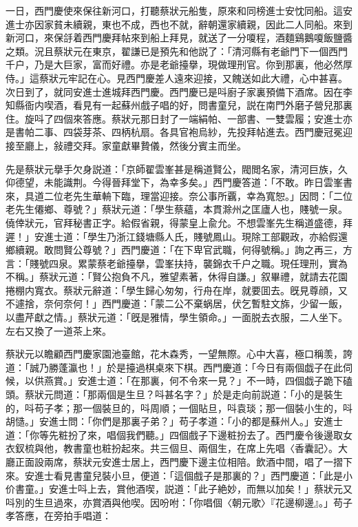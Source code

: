 一日，西門慶使來保往新河口，打聽蔡狀元船隻，原來和同榜進士安忱同船。這安進士亦因家貧未續親，東也不成，西也不就，辭朝還家續親，因此二人同船。來到新河口，來保㧱着西門慶拜帖來到船上拜見，就送了一分嗄程，酒麵鷄鵝嗄飯鹽醬之類。況且蔡狀元在東京，翟謙已是預先和他説了：「清河縣有老爺門下一個西門千户，乃是大巨家，富而好禮。亦是老爺擡擧，現做理刑官。你到那裏，他必然厚侍。」這蔡狀元牢記在心。見西門慶差人遠來迎接，又餽送如此大禮，心中甚喜。次日到了，就同安進士進城拜西門慶。西門慶已是呌廚子家裏預備下酒席。因在李知縣衙内喫酒，看見有一起蘇州戲子唱的好，問書童兒，説在南門外磨子營兒那裏住。旋呌了四個來答應。蔡狀元那日封了一端絹帕、一部書、一雙雲履；安進士亦是書帕二事、四袋芽茶、四柄杭扇。各具官袍烏紗，先投拜帖進去。西門慶冠冕迎接至廳上，敍禮交拜。家童獻畢贄儀，然後分賓主而坐。

先是蔡狀元擧手欠身説道：「京師翟雲峯甚是稱道賢公，閥閲名家，清河巨族，久仰德望，未能識荆。今得晉拜堂下，為幸多矣。」西門慶答道：「不敢。昨日雲峯書來，具道二位老先生華輈下臨，理當迎接。奈公事所覊，幸為寬恕。」因問：「二位老先生僊鄉、尊號？」蔡狀元道：「學生蔡蘊，本貫滁州之匡廬人也，賤號一泉。僥倖狀元，官拜秘書正字。給假省親，得蒙皇上兪允。不想雲峯先生稱道盛德，拜遲！」安進士道：「學生乃浙江錢塘縣人氏，賤號鳳山。現除工部觀政，亦給假還鄉續親。敢問賢公尊號？」西門慶道：「在下卑官武職，何得號稱。」詢之再三，方言：「賤號四泉。累蒙蔡老爺擡擧，雲峯扶持，襲錦衣千户之職。現任理刑，實為不稱。」蔡狀元道：「賢公抱負不凡，雅望素著，休得自謙。」叙畢禮，就請去花園捲棚内寬衣。蔡狀元辭道：「學生歸心匆匆，行舟在岸，就要囬去。旣見尊顔，又不遽捨，奈何奈何！」西門慶道：「蒙二公不棄蜗居，伏乞暫駐文旆，少留一飯，以盡芹獻之情。」蔡狀元道：「旣是雅情，學生領命。」一面脱去衣服，二人坐下。左右又換了一道茶上來。

蔡狀元以瞻顧西門慶家園池臺館，花木森秀，一望無際。心中大喜，極口稱羡，誇道：「誠乃勝蓬瀛也！」於是擡過棋桌來下棋。西門慶道：「今日有兩個戯子在此伺候，以供燕賞。」安進士道：「在那裏，何不令來一見？」不一時，四個戯子跪下磕頭。蔡狀元問道：「那兩個是生旦？呌甚名字？」於是走向前説道：「小的是裝生的，呌苟子孝；那一個裝旦的，呌周順；一個貼旦，呌袁琰；那一個裝小生的，呌胡慥。」安進士問：「你們是那裏子弟？」苟子孝道：「小的都是蘇州人。」安進士道：「你等先粧扮了來，唱個我們聽。」四個戲子下邊粧扮去了。西門慶令後邊取女衣釵梳與他，教書童也粧扮起來。共三個旦、兩個生，在席上先唱〈香囊記〉。大廳正面設兩席，蔡狀元安進士居上，西門慶下邊主位相陪。飲酒中間，唱了一摺下來。安進士看見書童兒裝小旦，便道：「這個戲子是那裏的？」西門慶道：「此是小价書童。」安進士呌上去，賞他酒喫，説道：「此子絶妙，而無以加矣！」蔡狀元又呌別的生旦過來，亦賞酒與他喫。因吩咐：「你唱個〈朝元歌〉『花邊柳邊』。」苟子孝答應，在旁拍手唱道：

